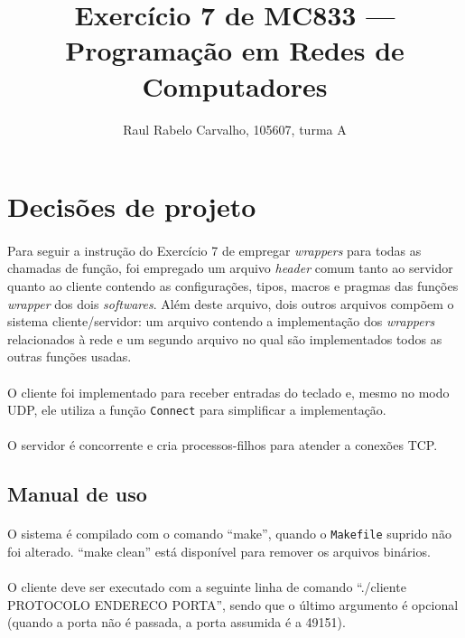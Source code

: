 \documentclass[a4paper,10pt,oneside,final,titlepage,onecolumn]{article}
\title{Exercício 7 de MC833 --- Programação em Redes de Computadores}
\author{Raul Rabelo Carvalho, 105607, turma A}
\begin{document}
\maketitle



\section{Decisões de projeto}
\paragraph{}Para seguir a instrução do Exercício 7 de empregar \emph{wrappers} para todas as chamadas de função, foi empregado um arquivo \emph{header} comum tanto ao servidor quanto ao cliente contendo as configurações, tipos, macros e pragmas das funções \emph{wrapper} dos dois \emph{softwares}. Além deste arquivo, dois outros arquivos compõem o sistema cliente/servidor: um arquivo contendo a implementação dos \emph{wrappers} relacionados à rede e um segundo arquivo no qual são implementados todos as outras funções usadas.
\paragraph{}O cliente foi implementado para receber entradas do teclado e, mesmo no modo UDP, ele utiliza a função \verb|Connect| para simplificar a implementação.
\paragraph{}O servidor é concorrente e cria processos-filhos para atender a conexões TCP.
\subsection{Manual de uso}
\paragraph{}O sistema é compilado com o comando ``make'', quando o \verb|Makefile| suprido não foi alterado. ``make clean'' está disponível para remover os arquivos binários.
\paragraph{}O cliente deve ser executado com a seguinte linha de comando ``./cliente PROTOCOLO ENDERECO PORTA'', sendo que o último argumento é opcional (quando a porta não é passada, a porta assumida é a 49151).
\end{document}
